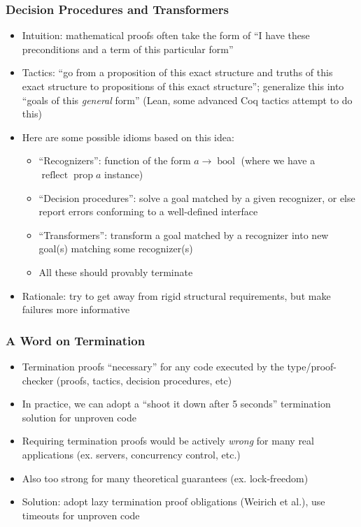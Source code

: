 \documentclass{beamer}
\begin{document}
\begin{frame}
  \frametitle{Decision Procedures and Transformers}
  \begin{itemize}
    \item Intuition: mathematical proofs often take the form of ``I
      have these preconditions and a term of this particular form''
    \item Tactics: ``go from a proposition of this exact structure and
      truths of this exact structure to propositions of this exact
      structure''; generalize this into ``goals of this \emph{general} form''
      (Lean, some advanced Coq tactics attempt to do this)
    \item Here are some possible idioms based on this idea:
      \begin{itemize}
        \item ``Recognizers'': function of the form $a \rightarrow
          \operatorname{bool}$ (where we have a $\operatorname{reflect}
          \operatorname{prop} a$ instance)
        \item ``Decision procedures'': solve a goal matched by a given
          recognizer, or else report errors conforming to a
          well-defined interface
        \item ``Transformers'': transform a goal matched by a
          recognizer into new goal(s) matching some recognizer(s)
        \item All these should provably terminate
      \end{itemize}
    \item Rationale: try to get away from rigid structural
      requirements, but make failures more informative
  \end{itemize}
\end{frame}

\begin{frame}
  \frametitle{A Word on Termination}
  \begin{itemize}
    \item Termination proofs ``necessary'' for any code executed by
      the type/proof-checker (proofs, tactics, decision procedures, etc)
    \item In practice, we can adopt a ``shoot it down after 5
      seconds'' termination solution for unproven code
    \item Requiring termination proofs would be actively \emph{wrong}
      for many real applications (ex. servers, concurrency control, etc.)
    \item Also too strong for many theoretical guarantees (ex. lock-freedom)
    \item Solution: adopt lazy termination proof obligations (Weirich
      et al.), use timeouts for unproven code
  \end{itemize}
\end{frame}
\end{document}
